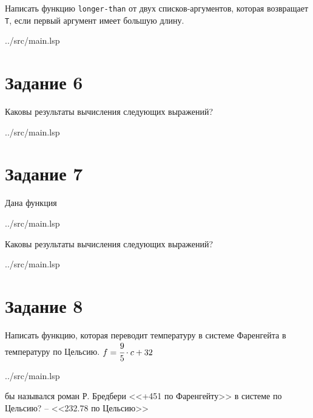 Написать функцию {\texttt{longer-than}} от двух списков-аргументов, которая возвращает {\texttt{T}}, если первый аргумент имеет большую длину.

\begin{lstinputlisting}[
	caption={Задание 5},
	label={lst:t5},
	style={lsp},
	linerange={18-19},
	]{../src/main.lsp}
\end{lstinputlisting}

\section*{Задание 6}

Каковы результаты вычисления следующих выражений?

\begin{lstinputlisting}[
	caption={Задание 6},
	label={lst:t6},
	style={lsp},
	linerange={22-28},
	]{../src/main.lsp}
\end{lstinputlisting}

\section*{Задание 7}

Дана функция 

\begin{lstinputlisting}[
	caption={mystery},
	label={lst:func},
	style={lsp},
	linerange={31-32},
	]{../src/main.lsp}
\end{lstinputlisting}

Каковы результаты вычисления следующих выражений?

\begin{lstinputlisting}[
	caption={Задание 7},
	label={lst:t7},
	style={lsp},
	linerange={35-38},
	]{../src/main.lsp}
\end{lstinputlisting}

\section*{Задание 8}

Написать функцию, которая переводит температуру в системе Фаренгейта в температуру по Цельсию. $f = \cfrac{9}{5}\cdot c + 32$

\begin{lstinputlisting}[
	caption={Задание 8},
	label={lst:t8},
	style={lsp},
	linerange={41-42},
	]{../src/main.lsp}
\end{lstinputlisting}

 бы назывался роман Р. Бредбери <<+451 по Фаренгейту>> в системе по Цельсию? -- <<232.78 по Цельсию>>

